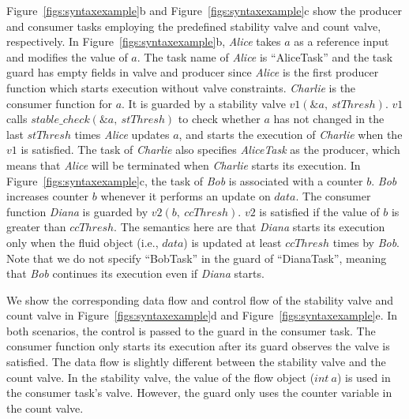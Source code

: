 Figure~\ref{figs:syntaxexample}b and Figure~\ref{figs:syntaxexample}c show the producer and consumer tasks employing the predefined stability valve and count valve, respectively. In Figure~\ref{figs:syntaxexample}b, {\it Alice} takes $a$ as a reference input and modifies the value of $a$. The task name of {\it Alice} is ``AliceTask'' and the task guard has empty fields in valve and producer since {\it Alice} is the first producer function which starts execution without valve constraints. {\it Charlie} is the consumer function for $a$. It is guarded by a stability valve $v1(\&a,\ stThresh)$. $v1$ calls $stable\_check(\&a,\ stThresh)$ to check whether $a$ has not changed in the last $stThresh$ times {\it Alice} updates $a$, and starts the execution of {\it Charlie} when the $v1$ is satisfied. The task of {\it Charlie} also specifies {\it AliceTask} as the producer, which means that {\it Alice} will be terminated when {\it Charlie} starts its execution. In Figure~\ref{figs:syntaxexample}c, the task of {\it Bob} is associated with a counter $b$. {\it Bob} increases counter $b$ whenever it performs an update on $data$. The consumer function {\it Diana} is guarded by $v2 (b,\ ccThresh)$. $v2$ is satisfied if the value of $b$ is greater than $ccThresh$. The semantics here are that {\it Diana} starts its execution only when the fluid object (i.e., $data$) is updated at least $ccThresh$ times by {\it Bob}. Note that we do not specify ``BobTask'' in the guard of ``DianaTask'', meaning that {\it Bob} continues its execution even if {\it Diana} starts.


We show the corresponding data flow and control flow of the stability valve and count valve in Figure~\ref{figs:syntaxexample}d and Figure~\ref{figs:syntaxexample}e. In both scenarios, the control is passed to the guard in the consumer task. The consumer function only starts its execution after its guard observes the valve is satisfied. The data flow is slightly different between the stability valve and the count valve. In the stability valve, the value of the flow object ($int\ a$) is used in the consumer task's valve. However, the guard only uses the counter variable in the count valve. %

